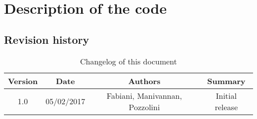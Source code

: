 \chapter{Description of the code}

\section{Revision history}
\begin{table}[h]
	\centering
	\begin{tabular}{|c|c|c|c|}
		\hline
		\textbf{Version} & \textbf{Date} & \textbf{Authors} & \textbf{Summary} \\
		\hline
		1.0 & 05/02/2017 & Fabiani, Manivannan, Pozzolini & Initial release  \\
		\hline
	\end{tabular}

	\caption{Changelog of this document}
	\label{tab:revision_history}
\end{table}